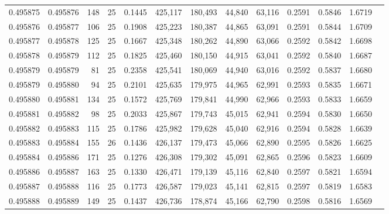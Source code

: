 \begin{tabular}{rrrrrrrrrrrrr}
0.495875 & 0.495876 &   148 &  25 &                                     0.1445 & 425,117 & 180,493 &  44,840 &  63,116 & 0.2591 & 0.5846 & 1.6719 \\
0.495876 & 0.495877 &   106 &  25 &                                     0.1908 & 425,223 & 180,387 &  44,865 &  63,091 & 0.2591 & 0.5844 & 1.6709 \\
0.495877 & 0.495878 &   125 &  25 &                                     0.1667 & 425,348 & 180,262 &  44,890 &  63,066 & 0.2592 & 0.5842 & 1.6698 \\
0.495878 & 0.495879 &   112 &  25 &                                     0.1825 & 425,460 & 180,150 &  44,915 &  63,041 & 0.2592 & 0.5840 & 1.6687 \\
0.495879 & 0.495879 &    81 &  25 &                                     0.2358 & 425,541 & 180,069 &  44,940 &  63,016 & 0.2592 & 0.5837 & 1.6680 \\
0.495879 & 0.495880 &    94 &  25 &                                     0.2101 & 425,635 & 179,975 &  44,965 &  62,991 & 0.2593 & 0.5835 & 1.6671 \\
0.495880 & 0.495881 &   134 &  25 &                                     0.1572 & 425,769 & 179,841 &  44,990 &  62,966 & 0.2593 & 0.5833 & 1.6659 \\
0.495881 & 0.495882 &    98 &  25 &                                     0.2033 & 425,867 & 179,743 &  45,015 &  62,941 & 0.2594 & 0.5830 & 1.6650 \\
0.495882 & 0.495883 &   115 &  25 &                                     0.1786 & 425,982 & 179,628 &  45,040 &  62,916 & 0.2594 & 0.5828 & 1.6639 \\
0.495883 & 0.495884 &   155 &  26 &                                     0.1436 & 426,137 & 179,473 &  45,066 &  62,890 & 0.2595 & 0.5826 & 1.6625 \\
0.495884 & 0.495886 &   171 &  25 &                                     0.1276 & 426,308 & 179,302 &  45,091 &  62,865 & 0.2596 & 0.5823 & 1.6609 \\
0.495886 & 0.495887 &   163 &  25 &                                     0.1330 & 426,471 & 179,139 &  45,116 &  62,840 & 0.2597 & 0.5821 & 1.6594 \\
0.495887 & 0.495888 &   116 &  25 &                                     0.1773 & 426,587 & 179,023 &  45,141 &  62,815 & 0.2597 & 0.5819 & 1.6583 \\
0.495888 & 0.495889 &   149 &  25 &                                     0.1437 & 426,736 & 178,874 &  45,166 &  62,790 & 0.2598 & 0.5816 & 1.6569 \\

\end{tabular}
